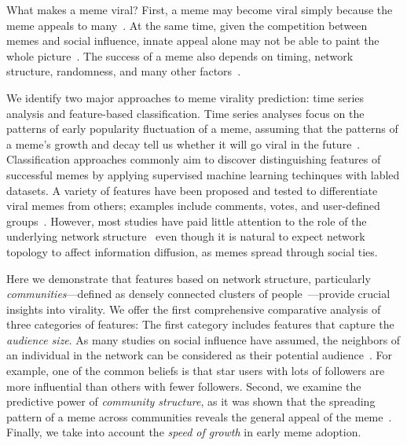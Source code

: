 \documentclass[letterpaper]{article}
\begin{document}
What makes a meme viral? First, a meme may become viral simply because the meme appeals to many~\cite{Berger:2009viral,cataldi2010}.  At the same time, given the competition between memes and social influence, innate appeal alone may not be able to paint the whole picture~\cite{Salganik2006music,Kitsak2010kcore,Mei2012tags}. The success of a meme also depends on timing, network structure, randomness, and many other factors~\cite{Centola2010SpreadExp,Weng:2012scirep,pinto2013using}.


We identify two major approaches to meme virality prediction: time series analysis and feature-based classification.
Time series analyses focus on the patterns of early popularity fluctuation of a meme, assuming that the patterns of a meme's growth and decay tell us whether it will go viral in the future~\cite{Jamali2009digging,asur_trends_2011,Yang2011temporal}.
Classification approaches commonly aim to discover distinguishing features of successful memes by applying supervised machine learning techinques with labled datasets.
A variety of features have been proposed and tested to differentiate viral memes from others; examples include comments, votes, and user-defined groups~\cite{Lerman2010www,Jamali2009digging,Suh2010,Hong2011popu,Mei2012tags}. However, most studies have paid little attention to the role of the underlying network structure~\cite{romero2011popu,ma2013predicting} even though it is natural to expect network topology to affect information diffusion, as memes spread through social ties.


Here we demonstrate that features based on network structure, particularly \emph{communities}---defined as densely connected clusters of people~\cite{fortunato2010community}---provide crucial insights into virality. We offer the first comprehensive comparative analysis of three categories of features:
The first category includes features that capture the \emph{audience size}. As many studies on social influence have assumed, the neighbors of an individual in the network can be considered as their potential audience~\cite{Kitsak2010kcore,cha2010measuring,Suh2010,bakshy_everyones_2011}.  For example, one of the common beliefs is that star users with lots of followers are more influential than others with fewer followers.
Second, we examine the predictive power of \emph{community structure}, as it was shown that the spreading pattern of a meme across communities reveals the general appeal of the meme~\cite{weng2013viral}.
Finally, we take into account the \emph{speed of growth} in early meme adoption.
\end{document}

